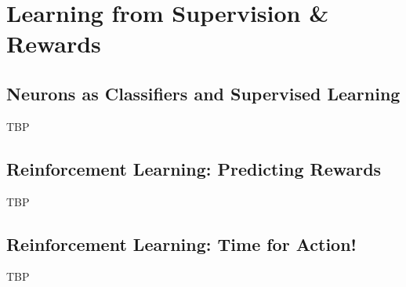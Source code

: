 \documentclass[]{article}
\begin{document}
\section{Learning from Supervision \& Rewards}\label{sec:week8}

\subsection{Neurons as Classifiers and Supervised Learning}
TBP

\subsection{Reinforcement Learning: Predicting Rewards}
TBP

\subsection{Reinforcement Learning: Time for Action!}
TBP

\appendix

\printglossaries




\end{document}
